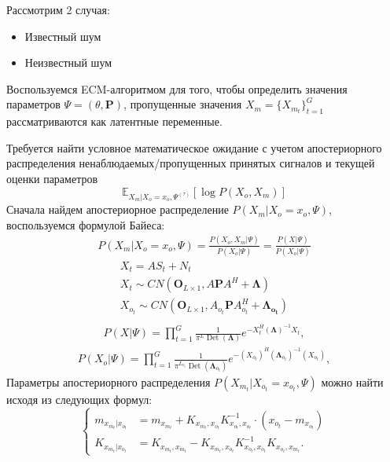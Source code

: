 \documentclass[11pt]{article}
\newcommand{\Expect}{\mathbb{E}}
\DeclareMathOperator{\Det}{Det}
\begin{document}
Рассмотрим 2 случая:
\begin{itemize}
\item
Известный шум
\item
Неизвестный шум
\end{itemize}
\begin{center}
\fontsize{16}{20}\selectfont {}
\end{center}
Воспользуемся ECM-алгоритмом для того, чтобы определить значения параметров $\Psi = (\theta, \mathbf{P})$, пропущенные значения $X_m=\{X_{m_t}\}_{t=1}^G$ рассматриваются как латентные переменные.
\begin{center}
\fontsize{14}{18}\selectfont {}
\end{center}
Требуется найти условное математическое ожидание с учетом апостериорного распределения ненаблюдаемых/пропущенных принятых сигналов и текущей оценки параметров
\begin{equation}
 \Expect_{X_m|X_o=x_o, \Psi^{(\tau)}}[\log P(X_o, X_m)]
\end{equation}
Сначала найдем апостериорное распределение $P(X_m|X_o=x_o,\Psi)$, воспользуемся формулой Байеса:
\begin{gather}
P(X_m|X_o=x_o,\Psi) = \frac{P(X_o, X_m|\Psi)}{P(X_o|\Psi)} = \frac{P(X|\Psi)}{P(X_o|\Psi)}
\end{gather}
\begin{gather*}
X_t = AS_t + N_t \\
X_t \sim CN(\mathbf{O}_{L \times 1}, A\mathbf{P}A^H + \mathbf{\Lambda})\\
X_{o_t} \sim CN(\mathbf{O}_{L \times 1}, A_{o_t}\mathbf{P}A_{o_t}^H + \mathbf{\Lambda_{o_t}})\\
\end{gather*}
\begin{gather}
P(X|\Psi) = \prod_{t=1}^G \frac{1}{\pi^L \Det(\mathbf{\Lambda})}e^{-X_t^H (\mathbf{\Lambda})^{-1}X_t},
\end{gather}
\begin{gather}
P(X_o|\Psi) = \prod_{t=1}^G \frac{1}{\pi^{L_{o_t}} \Det(\mathbf{\Lambda}_{o_t})}e^{-(X_{o_t})^H (\mathbf{\Lambda}_{o_t})^{-1}(X_{o_t})},
\end{gather}
Параметры апостериорного распределения $P(X_{m_t}|X_{o_t}=x_{o_t},\Psi)$ можно найти исходя из следующих формул:
\begin{equation}
\left\{ \begin{aligned} 
m_{x_{m_t}|x_{o_t}} &= m_{x_{m_t}} + K_{x_{m_t},x_{o_t}}K_{x_{o_t},x_{o_t}}^{-1}\cdot(x_{o_t}-m_{x_{o_t}}) \\
K_{x_{m_t}|x_{o_t}} &= K_{x_{m_t},x_{m_t}}-K_{x_{m_t},x_{o_t}}K_{x_{o_t},x_{o_t}}^{-1}K_{x_{o_t},x_{m_t}}.
\end{aligned} \right.
\end{equation}
\end{document}
